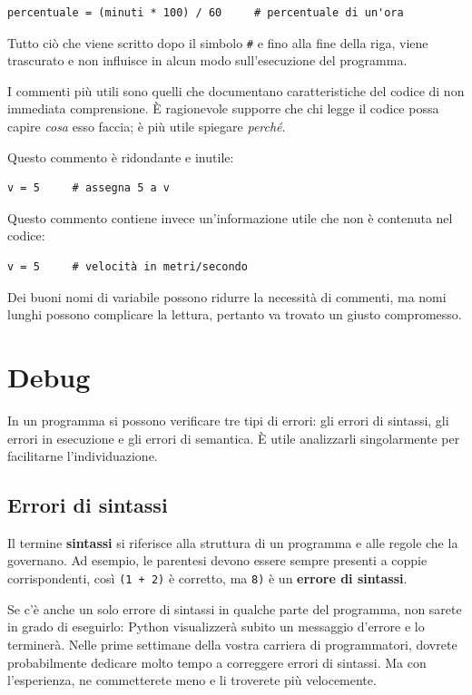 \documentclass[10pt]{book}
\begin{document}
\begin{verbatim}
percentuale = (minuti * 100) / 60     # percentuale di un'ora
\end{verbatim}
%
Tutto ciò che viene scritto dopo il simbolo {\tt \#} e fino alla fine della riga, viene trascurato e non influisce in alcun modo sull'esecuzione del programma. 

I commenti più utili sono quelli che documentano caratteristiche del codice di non immediata comprensione. È ragionevole supporre che chi legge il codice possa capire {\em cosa} esso faccia; è più utile spiegare {\em perché}.

Questo commento è ridondante e inutile:

\begin{verbatim}
v = 5     # assegna 5 a v
\end{verbatim}
%
Questo commento contiene invece un'informazione utile che non è contenuta nel codice:

\begin{verbatim}
v = 5     # velocità in metri/secondo 
\end{verbatim}
%
Dei buoni nomi di variabile possono ridurre la necessità di commenti, ma nomi lunghi possono complicare la lettura, pertanto va trovato un giusto compromesso.


\section{Debug}

In un programma si possono verificare tre tipi di errori: gli errori di sintassi, gli errori in esecuzione e gli errori di semantica. È utile analizzarli singolarmente per facilitarne l'individuazione.

\subsection{Errori di sintassi}

Il termine {\bf sintassi} si riferisce alla struttura di un programma e alle regole che la governano. Ad esempio, le parentesi devono essere sempre presenti a coppie corrispondenti, così {\tt (1 + 2)} è corretto, ma {\tt 8)} è un {\bf errore di sintassi}.

Se c'è anche un solo errore di sintassi in qualche parte del programma, non sarete in grado di eseguirlo: Python visualizzerà subito un messaggio d'errore e lo terminerà. Nelle prime settimane della vostra carriera di programmatori, dovrete probabilmente dedicare molto tempo a correggere errori di sintassi. Ma con l'esperienza, ne commetterete meno e li troverete più velocemente.
\end{document}
